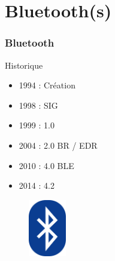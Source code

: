 \section{Bluetooth(s)}

\begin{frame}[t]
	\frametitle{Bluetooth}

	\begin{minipage}[t]{0.50\linewidth}
		\begin{block}{Historique}
			\begin{itemize}
				\item 1994 : Création
				\item 1998 : SIG
				\item 1999 : 1.0
				\item 2004 : 2.0 BR / EDR
				\item 2010 : 4.0 BLE
				\item 2014 : 4.2
			\end{itemize}
		\end{block}
	\end{minipage}
	\begin{minipage}[t]{0.25\linewidth}
		\begin{figure}
			\includegraphics[height=2.5cm]{img/bt_logo.png}
		\end{figure}
	\end{minipage}
\end{frame}

